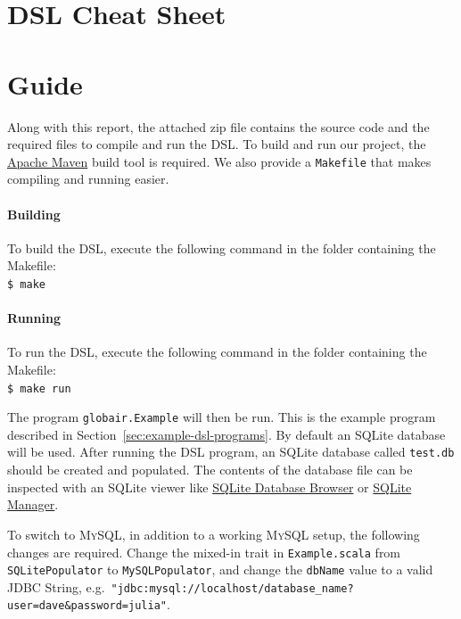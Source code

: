 \documentclass[a4paper]{article}
\newcommand{\cc}[1]{\texttt{#1}}
\renewcommand{\sc}[1]{\lstinline{#1}}
\begin{document}
\clearpage
\section{DSL Cheat Sheet}
\label{sec: cheat-sheet}




\clearpage
\section{Guide}
\label{sec:guide}


Along with this report, the attached zip file contains the source code and the required files to compile and run the DSL\@.
To build and run our project, the \href{http://maven.apache.org/}{Apache Maven} build tool is required.
We also provide a \cc{Makefile} that makes compiling and running easier.

\paragraph{Building}
To build the DSL, execute the following command in the folder containing the Makefile:\\
\cc{\$ make}

\paragraph{Running}
To run the DSL, execute the following command in the folder containing the Makefile:\\
\cc{\$ make run}

The program \cc{globair.Example} will then be run.
This is the example program described in Section~\ref{sec:example-dsl-programs}.
By default an SQLite database will be used.
After running the DSL program, an SQLite database called \cc{test.db} should be created and populated.
The contents of the database file can be inspected with an SQLite viewer like \href{http://sourceforge.net/projects/sqlitebrowser/}{SQLite Database Browser} or \href{https://addons.mozilla.org/en-us/firefox/addon/sqlite-manager/}{SQLite Manager}.

To switch to \textsc{MySQL}, in addition to a working \textsc{MySQL} setup, the following changes are required.
Change the mixed-in trait in \cc{Example.scala} from \cc{SQLite\-Populator} to \cc{MySQL\-Populator}, and change the \sc{dbName} value to a valid JDBC String, e.g.\ {\color{Thistle}\cc{"jdbc:mysql://localhost/database\_name?user=dave\&password=julia"}}.
\end{document}
